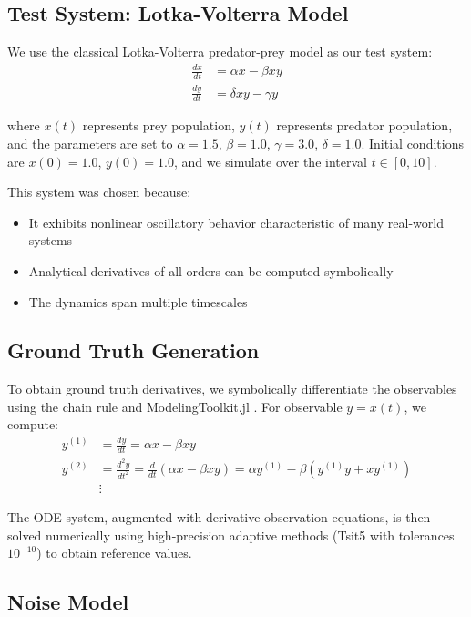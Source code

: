\documentclass[11pt,a4paper]{article}
\begin{document}
\subsection{Test System: Lotka-Volterra Model}

We use the classical Lotka-Volterra predator-prey model as our test system:
\begin{align}
\frac{dx}{dt} &= \alpha x - \beta xy \\
\frac{dy}{dt} &= \delta xy - \gamma y
\end{align}

where $x(t)$ represents prey population, $y(t)$ represents predator population, and the parameters are set to $\alpha=1.5$, $\beta=1.0$, $\gamma=3.0$, $\delta=1.0$. Initial conditions are $x(0)=1.0$, $y(0)=1.0$, and we simulate over the interval $t\in[0,10]$.

This system was chosen because:
\begin{itemize}
    \item It exhibits nonlinear oscillatory behavior characteristic of many real-world systems
    \item Analytical derivatives of all orders can be computed symbolically
    \item The dynamics span multiple timescales
\end{itemize}

\subsection{Ground Truth Generation}

To obtain ground truth derivatives, we symbolically differentiate the observables using the chain rule and ModelingToolkit.jl \cite{ma2021modelingtoolkit}. For observable $y=x(t)$, we compute:
\begin{align}
y^{(1)} &= \frac{dy}{dt} = \alpha x - \beta xy \\
y^{(2)} &= \frac{d^2y}{dt^2} = \frac{d}{dt}(\alpha x - \beta xy) = \alpha y^{(1)} - \beta(y^{(1)} y + x y^{(1)}) \\
&\vdots
\end{align}

The ODE system, augmented with derivative observation equations, is then solved numerically using high-precision adaptive methods (Tsit5 with tolerances $10^{-10}$) to obtain reference values.

\subsection{Noise Model}
\end{document}
